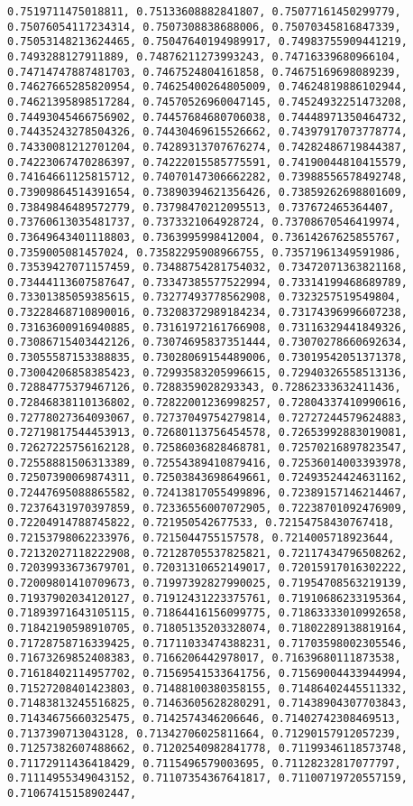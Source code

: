 \documentclass[11pt]{article}
\begin{document}
\begin{Verbatim}[commandchars=\\\{\}]
0.7519711475018811, 0.75133608882841807, 0.75077161450299779, 0.75076054117234314, 0.7507308838688006, 0.75070345816847339, 0.75053148213624465, 0.75047640194989917, 0.74983755909441219, 0.7493288127911889, 0.74876211273993243, 0.74716339680966104, 0.74714747887481703, 0.7467524804161858, 0.74675169698089239, 0.74627665285820954, 0.74625400264805009, 0.74624819886102944, 0.74621395898517284, 0.74570526960047145, 0.74524932251473208, 0.74493045466756902, 0.74457684680706038, 0.74448971350464732, 0.74435243278504326, 0.74430469615526662, 0.74397917073778774, 0.74330081212701204, 0.74289313707676274, 0.74282486719844387, 0.74223067470286397, 0.74222015585775591, 0.74190044810415579, 0.74164661125815712, 0.74070147306662282, 0.73988556578492748, 0.73909864514391654, 0.73890394621356426, 0.73859262698801609, 0.73849846489572779, 0.73798470212095513, 0.737672465364407, 0.73760613035481737, 0.7373321064928724, 0.73708670546419974, 0.73649643401118803, 0.7363995998412004, 0.73614267625855767, 0.7359005081457024, 0.73582295908966755, 0.73571961349591986, 0.73539427071157459, 0.73488754281754032, 0.73472071363821168, 0.73444113607587647, 0.73347385577522994, 0.73314199468689789, 0.73301385059385615, 0.73277493778562908, 0.7323257519549804, 0.73228468710890016, 0.73208372989184234, 0.73174396996607238, 0.73163600916940885, 0.73161972161766908, 0.73116329441849326, 0.73086715403442126, 0.73074695837351444, 0.73070278660692634, 0.73055587153388835, 0.73028069154489006, 0.73019542051371378, 0.73004206858385423, 0.72993583205996615, 0.72940326558513136, 0.72884775379467126, 0.7288359028293343, 0.72862333632411436, 0.72846838110136802, 0.72822001236998257, 0.72804337410990616, 0.72778027364093067, 0.72737049754279814, 0.72727244579624883, 0.72719817544453913, 0.72680113756454578, 0.72653992883019081, 0.72627225756162128, 0.72586036828468781, 0.72570216897823547, 0.72558881506313389, 0.72554389410879416, 0.72536014003393978, 0.72507390069874311, 0.72503843698649661, 0.72493524424631162, 0.72447695088865582, 0.72413817055499896, 0.72389157146214467, 0.72376431970397859, 0.72336556007072905, 0.72238701092476909, 0.72204914788745822, 0.721950542677533, 0.72154758430767418, 0.72153798062233976, 0.7215044755157578, 0.7214005718923644, 0.72132027118222908, 0.72128705537825821, 0.72117434796508262, 0.72039933673679701, 0.72031310652149017, 0.72015917016302222, 0.72009801410709673, 0.71997392827990025, 0.71954708563219139, 0.71937902034120127, 0.71912431223375761, 0.71910686233195364, 0.71893971643105115, 0.71864416156099775, 0.71863333010992658, 0.71842190598910705, 0.71805135203328074, 0.71802289138819164, 0.71728758716339425, 0.71711033474388231, 0.71703598002305546, 0.71673269852408383, 0.7166206442978017, 0.71639680111873538, 0.71618402114957702, 0.71569541533641756, 0.71569004433944994, 0.71527208401423803, 0.71488100380358155, 0.71486402445511332, 0.71483813245516825, 0.71463605628280291, 0.71438904307703843, 0.71434675660325475, 0.7142574346206646, 0.71402742308469513, 0.7137390713043128, 0.71342706025811664, 0.71290157912057239, 0.71257382607488662, 0.71202540982841778, 0.71199346118573748, 0.71172911436418429, 0.7115496579003695, 0.71128232817077797, 0.71114955349043152, 0.71107354367641817, 0.71100719720557159, 0.71067415158902447, 
\end{Verbatim}
\end{document}

